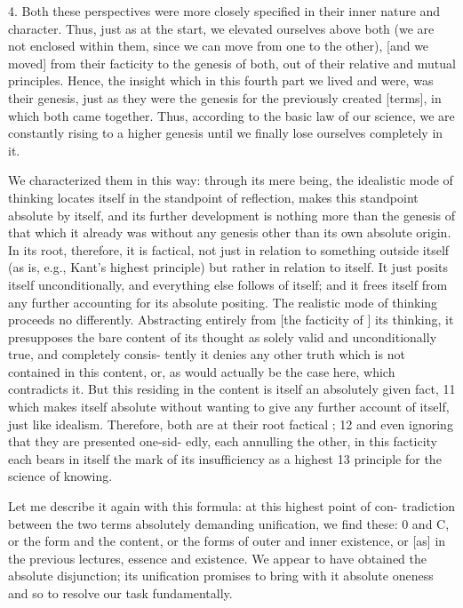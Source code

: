 4. Both these perspectives were more closely specified
in their inner nature and character.
Thus, just as at the start, we elevated ourselves above both
(we are not enclosed within them,
since we can move from one to the other),
[and we moved] from their facticity to the genesis of both,
out of their relative and mutual principles.
Hence, the insight which in this fourth part
we lived and were, was their genesis,
just as they were the genesis
for the previously created [terms],
in which both came together.
Thus, according to the basic law of our science,
we are constantly rising to a higher genesis
until we finally lose ourselves completely in it.

We characterized them in this way:
through its mere being,
the idealistic mode of thinking locates itself
in the standpoint of reflection,
makes this standpoint absolute by itself,
and its further development is nothing more than
the genesis of that which it already was
without any genesis other than its own absolute origin.
In its root, therefore, it is factical,
not just in relation to something outside itself
(as is, e.g., Kant's highest principle)
but rather in relation to itself.
It just posits itself unconditionally,
and everything else follows of itself;
and it frees itself from any further accounting for its absolute positing.
The realistic mode of thinking proceeds no differently.
Abstracting
entirely from [the facticity of ]  its thinking, it presupposes the bare content
of its thought as solely valid and unconditionally true, and completely consis-
tently it denies any other truth which is not contained in this content, or, as
would actually be the case here, which contradicts it.
But this residing in the
content is itself an absolutely given fact, 11 which makes itself absolute without
wanting to give any further account of itself, just like idealism.
Therefore, both
are at their root factical ; 12 and even ignoring that they are presented one-sid-
edly, each annulling the other, in this facticity each bears in itself the mark of
its insufficiency as a highest 13 principle for the science of knowing.

Let me describe it again with this formula: at this highest point of con-
tradiction between the two terms absolutely demanding unification, we find
these: 0 and C, or the form and the content, or the forms of outer and inner
existence, or [as] in the previous lectures, essence and existence.
We appear to have obtained the absolute disjunction;
its unification promises to bring with it absolute oneness
and so to resolve our task fundamentally.

